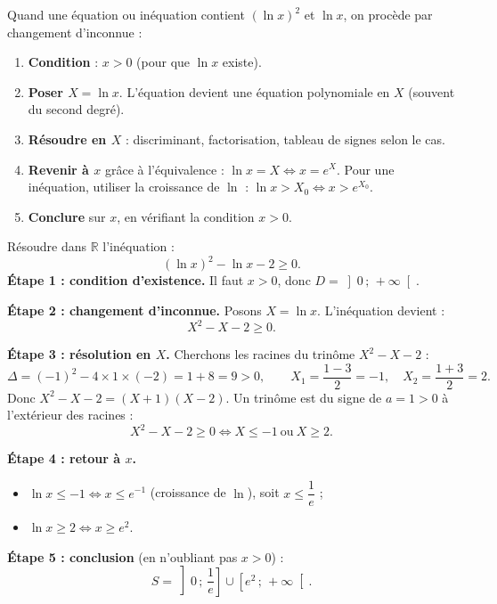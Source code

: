 \documentclass[11pt]{article}
\newcommand{\cle}[1]{{\popxbold\color{popdark}#1}}
\begin{document}
\begin{methode}[Poser l'inconnue auxiliaire $X = \ln x$]
Quand une équation ou inéquation contient $(\ln x)^2$ et $\ln x$, on procède par \cle{changement d'inconnue} :
\begin{enumerate}
\item \textbf{Condition} : $x > 0$ (pour que $\ln x$ existe).
\item \textbf{Poser $X = \ln x$}. L'équation devient une équation polynomiale en $X$ (souvent du second degré).
\item \textbf{Résoudre en $X$} : discriminant, factorisation, tableau de signes selon le cas.
\item \textbf{Revenir à $x$} grâce à l'équivalence : $\ln x = X \iff x = e^{X}$. Pour une inéquation, utiliser la croissance de $\ln$ : $\ln x > X_0 \iff x > e^{X_0}$.
\item \textbf{Conclure} sur $x$, en vérifiant la condition $x > 0$.
\end{enumerate}
\end{methode}

\begin{exoresolu}
Résoudre dans $\mathbb{R}$ l'inéquation :
\[ (\ln x)^2 - \ln x - 2 \geqslant 0. \]
\tcblower
\textbf{Étape 1 : condition d'existence.} Il faut $x > 0$, donc $D = \left]0\,;\,+\infty\right[$.

\textbf{Étape 2 : changement d'inconnue.} Posons $X = \ln x$. L'inéquation devient :
\[ X^2 - X - 2 \geqslant 0. \]

\textbf{Étape 3 : résolution en $X$.} Cherchons les racines du trinôme $X^2 - X - 2$ :
\[ \Delta = (-1)^2 - 4 \times 1 \times (-2) = 1 + 8 = 9 > 0, \qquad X_1 = \frac{1 - 3}{2} = -1, \quad X_2 = \frac{1+3}{2} = 2. \]
Donc $X^2 - X - 2 = (X+1)(X-2)$. Un trinôme est du signe de $a = 1 > 0$ à l'extérieur des racines :
\[ X^2 - X - 2 \geqslant 0 \iff X \leqslant -1 \ \text{ou}\ X \geqslant 2. \]

\textbf{Étape 4 : retour à $x$.}
\begin{itemize}
\item $\ln x \leqslant -1 \iff x \leqslant e^{-1}$ (croissance de $\ln$), soit $x \leqslant \dfrac{1}{e}$ ;
\item $\ln x \geqslant 2 \iff x \geqslant e^{2}$.
\end{itemize}

\textbf{Étape 5 : conclusion} (en n'oubliant pas $x > 0$) :
\[ \boxed{S = \left]0\,;\,\frac{1}{e}\right] \cup \left[e^{2}\,;\,+\infty\right[}. \]
\end{exoresolu}
\end{document}

